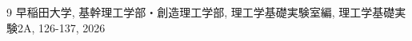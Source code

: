 
\begin{thebibliography}{9}
  早稲田大学, 基幹理工学部・創造理工学部, 理工学基礎実験室編, 理工学基礎実験2A, 126-137, 2026
\end{thebibliography}